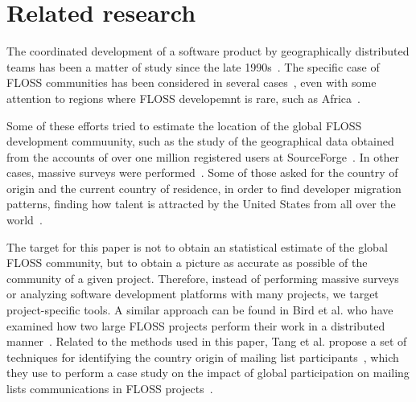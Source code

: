 \documentclass{sig-alternate-05-2015}
\begin{document}
%
%
% 


\section{Related research}
\label{sec:related}

The coordinated development of a software product by geographically distributed
teams has been a matter of study since the late 1990s~\cite{carmel1999global}.
The specific case of FLOSS communities has been considered in several cases~\cite{german2003gnome,engelhardt2009geographic,von2010geographic}, even with some attention to regions where FLOSS developemnt is rare, such as Africa~\cite{ouattara2013open}.

Some of these efforts tried to estimate the location of the global FLOSS development commuunity, such as the study of the geographical data obtained from the accounts of over one million registered users at SourceForge~\cite{robles2006geographic,gonzalez2008geographic}. In other cases, massive surveys were performed~\cite{ghosh2002free,david2008community}. Some of those asked for the country of origin and the current country of residence, in order to find developer migration patterns, finding how talent is attracted by the United States from all over the world~\cite{ghosh2002free}.

The target for this paper is not to obtain an statistical estimate of the global FLOSS community, but to obtain a picture as accurate as possible of the community of a given project. Therefore, instead of performing massive surveys or analyzing software development platforms with many projects, we target project-specific tools. A similar approach can be found in Bird et al. who have examined how two large FLOSS projects perform their work in a distributed manner~\cite{bird2012examining}. Related to the methods used in this paper, Tang et al. propose a set of 
techniques for identifying the country origin of mailing list participants~\cite{tang2009techniques}, which they use to perform a case study on the impact of global participation on mailing lists communications in FLOSS projects~\cite{tang2009case}.
\end{document}
